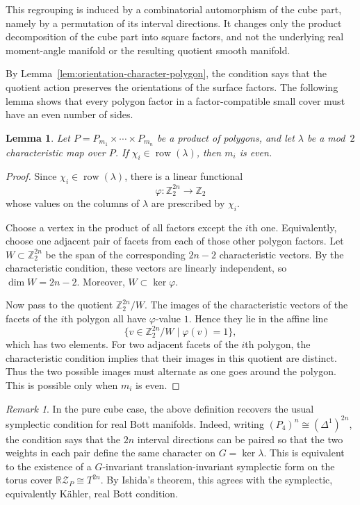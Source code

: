 \documentclass{amsart}
\newtheorem{lemma}[theorem]{Lemma}
\numberwithin{equation}{section}
\theoremstyle{definition}
\theoremstyle{remark}
\newtheorem{remark}[theorem]{Remark}
\newcommand{\Z}{\mathbb Z}
\newcommand{\RZ}{\mathbb R\mathcal Z}
\DeclareMathOperator{\row}{row}
\begin{document}
This regrouping is induced by a combinatorial automorphism of the cube part, namely by a permutation of its interval directions. 
It changes only the product decomposition of the cube part into square factors, and not the underlying real moment-angle manifold or the resulting quotient smooth manifold.

By Lemma~\ref{lem:orientation-character-polygon}, the condition says that the quotient action preserves the orientations of the surface factors.
The following lemma shows that every polygon factor in a factor-compatible small cover must have an even number of sides.

\begin{lemma}\label{lem:odd-factor-not-compatible}
Let $P = P_{m_1} \times \cdots \times P_{m_n}$ be a product of polygons, and let $\lambda$ be a mod~$2$ characteristic map over $P$.
If $\chi_i \in \row(\lambda)$, then $m_i$ is even.
\end{lemma}
\begin{proof}
Since $\chi_i \in \row(\lambda)$, there is a linear functional
    $$
        \varphi\colon \Z_2^{2n}\to \Z_2
    $$
whose values on the columns of $\lambda$ are prescribed by $\chi_i$.
    
Choose a vertex in the product of all factors except the $i$th one.
Equivalently, choose one adjacent pair of facets from each of those other polygon factors.
Let $W \subset \Z_2^{2n}$ be the span of the corresponding $2n-2$ characteristic vectors.
By the characteristic condition, these vectors are linearly independent, so $\dim W=2n-2$.
Moreover, $W\subset \ker\varphi$.
    
Now pass to the quotient $\Z_2^{2n}/W$.
The images of the characteristic vectors of the facets of the $i$th polygon all have $\varphi$-value $1$.
Hence they lie in the affine line
    $$
        \{v\in \Z_2^{2n}/W\mid \varphi(v)=1\},
    $$
which has two elements.
For two adjacent facets of the $i$th polygon, the characteristic condition implies that their images in this quotient are distinct.
Thus the two possible images must alternate as one goes around the polygon.
This is possible only when $m_i$ is even.
\end{proof}

\begin{remark}\label{rem:pure-cube-case}
In the pure cube case, the above definition recovers the usual symplectic condition for real Bott manifolds. 
Indeed, writing $(P_4)^n\cong(\Delta^1)^{2n}$, the condition says that the $2n$ interval directions can be paired so that the two weights in each pair define the same character on $G=\ker\lambda$. 
This is equivalent to the existence of a $G$-invariant translation-invariant symplectic form on the torus cover $\RZ_P\cong T^{2n}$. 
By Ishida's theorem, this agrees with the symplectic, equivalently K\"ahler, real Bott condition.
\end{remark}
\end{document}
